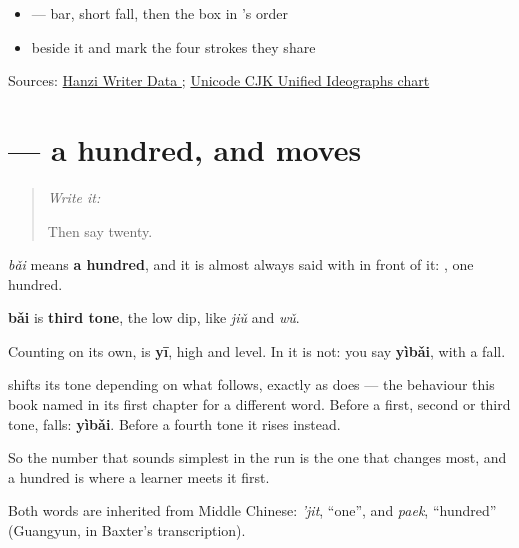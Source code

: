 \begin{itemize}
\raggedright
  \item {} — bar, short fall, then the box in 's order
  \item {} beside it and mark the four strokes they share
\end{itemize}

\begin{tcolorbox}[breakable,colback=teal!4,colframe=teal!35!black,title={Before you move on}]
Sources: \href{https://raw.githubusercontent.com/chanind/hanzi-writer-data/68d10a4b21150cae5e1ebbd223eed289cf32d90c/data/\%E7\%99\%BE.json}{Hanzi Writer Data }; \href{https://www.unicode.org/charts/PDF/U4E00.pdf}{Unicode CJK Unified Ideographs chart}
\end{tcolorbox}
\section[\texorpdfstring{\zh{一百} (yìbǎi)}{一百 (yìbǎi)}]{ — a hundred, and  moves}

\label{lesson:ZH-C21-bai}



\begin{quote}
\emph{Write it:} 

Then say twenty.
\end{quote}

\begin{sounds}
\textbf{} \emph{bǎi} means \textbf{a hundred}, and it is almost always said with  in front of it: \textbf{}, one hundred.

\textbf{bǎi} is \textbf{third tone}, the low dip, like \emph{jiǔ} and \emph{wǔ}.
\end{sounds}

\begin{cousinweb}
Counting on its own,  is \textbf{yī}, high and level. In \textbf{} it is not: you say \textbf{yìbǎi}, with a fall.

 shifts its tone depending on what follows, exactly as \textbf{} does — the behaviour this book named in its first chapter for a different word. Before a first, second or third tone,  falls: \textbf{yìbǎi}. Before a fourth tone it rises instead.

So the number that sounds simplest in the run is the one that changes most, and a hundred is where a learner meets it first.

Both words are inherited from Middle Chinese: \emph{'jit}, \textquotedblleft{}one\textquotedblright{}, and \emph{paek}, \textquotedblleft{}hundred\textquotedblright{} (Guangyun, in Baxter's transcription).
\end{cousinweb}

